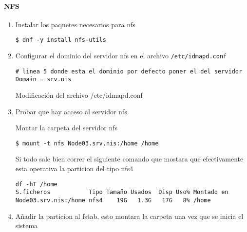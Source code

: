 \documentclass[../main.tex]{subfiles}
\begin{document}
\paragraph{NFS}
\begin{enumerate}
  \item Instalar los paquetes necesarios para \Gls{nfs}

        \begin{listing}[H]
\begin{verbatim}
$ dnf -y install nfs-utils
\end{verbatim}
        \end{listing}
  \item Configurar el dominio del servidor \Gls{nfs} en el
        archivo \texttt{/etc/idmapd.conf}
        \begin{listing}[H]
\begin{verbatim}
# linea 5 donde esta el dominio por defecto poner el del servidor
Domain = srv.nis
\end{verbatim}
          \label{list:idmap}
          \caption{Modificación del archivo /etc/idmapd.conf}
        \end{listing}

  \item Probar que hay acceso al servidor \Gls{nfs}

        Montar la carpeta del servidor \Gls{nfs}

        \begin{listing}[H]
\begin{verbatim}
$ mount -t nfs Node03.srv.nis:/home /home
\end{verbatim}
        \end{listing}

        Si todo sale bien correr el siguiente comando que mostara que
        efectivamente esta operativa la particion del tipo \Gls{nfs}4

        \begin{listing}[H]
\begin{verbatim}
df -hT /home
S.ficheros           Tipo Tamaño Usados  Disp Uso% Montado en
Node03.srv.nis:/home nfs4    19G   1.3G   17G   8% /home
\end{verbatim}
        \end{listing}

  \item Añadir la particion al \Gls{fstab}, esto montara la carpeta una vez
        que se inicia el sistema


\end{enumerate}
\end{document}
